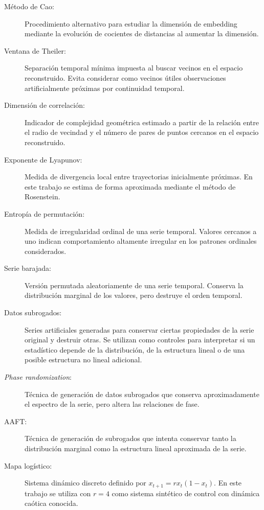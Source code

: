 \begin{description}
    \item[Método de Cao:] Procedimiento alternativo para estudiar la dimensión de embedding mediante la evolución de cocientes de distancias al aumentar la dimensión.

    \item[Ventana de Theiler:] Separación temporal mínima impuesta al buscar vecinos en el espacio reconstruido. Evita considerar como vecinos útiles observaciones artificialmente próximas por continuidad temporal.

    \item[Dimensión de correlación:] Indicador de complejidad geométrica estimado a partir de la relación entre el radio de vecindad y el número de pares de puntos cercanos en el espacio reconstruido.

    \item[Exponente de Lyapunov:] Medida de divergencia local entre trayectorias inicialmente próximas. En este trabajo se estima de forma aproximada mediante el método de Rosenstein.

    \item[Entropía de permutación:] Medida de irregularidad ordinal de una serie temporal. Valores cercanos a uno indican comportamiento altamente irregular en los patrones ordinales considerados.

    \item[Serie barajada:] Versión permutada aleatoriamente de una serie temporal. Conserva la distribución marginal de los valores, pero destruye el orden temporal.

    \item[Datos subrogados:] Series artificiales generadas para conservar ciertas propiedades de la serie original y destruir otras. Se utilizan como controles para interpretar si un estadístico depende de la distribución, de la estructura lineal o de una posible estructura no lineal adicional.

    \item[\textit{Phase randomization}:] Técnica de generación de datos subrogados que conserva aproximadamente el espectro de la serie, pero altera las relaciones de fase.

    \item[AAFT:] Técnica de generación de subrogados que intenta conservar tanto la distribución marginal como la estructura lineal aproximada de la serie.

    \item[Mapa logístico:] Sistema dinámico discreto definido por \(x_{t+1} = r x_t(1-x_t)\). En este trabajo se utiliza con \(r=4\) como sistema sintético de control con dinámica caótica conocida.


\end{description}
